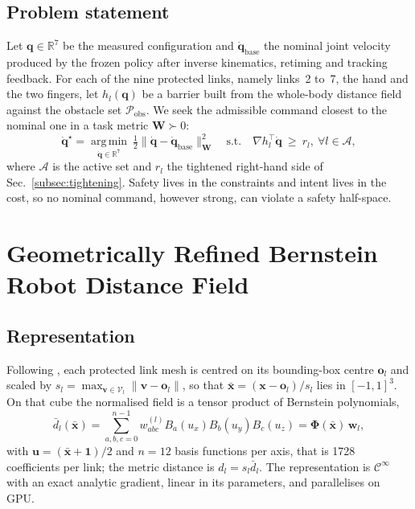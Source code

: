 \documentclass[journal]{IEEEtran}
\newcommand{\qdot}{\dot{\mathbf{q}}}
\begin{document}
\subsection{Problem statement}
Let $\mathbf{q}\in\mathbb{R}^7$ be the measured configuration and $\qdot_{\mathrm{base}}$ the nominal joint velocity produced by the frozen policy after inverse kinematics, retiming and tracking feedback. For each of the nine protected links, namely links~2 to~7, the hand and the two fingers, let $h_l(\mathbf{q})$ be a barrier built from the whole-body distance field against the obstacle set $\mathcal{P}_{\mathrm{obs}}$. We seek the admissible command closest to the nominal one in a task metric $\mathbf{W}\succ 0$:
\begin{equation}\label{eq:qp}
\qdot^{\star}=\operatorname*{arg\,min}_{\qdot\in\mathbb{R}^7}\ \tfrac12\|\qdot-\qdot_{\mathrm{base}}\|_{\mathbf{W}}^2
\quad\text{s.t.}\quad \nabla h_l^{\top}\qdot\ \ge\ r_l,\ \forall l\in\mathcal{A},
\end{equation}
where $\mathcal{A}$ is the active set and $r_l$ the tightened right-hand side of Sec.~\ref{subsec:tightening}. Safety lives in the constraints and intent lives in the cost, so no nominal command, however strong, can violate a safety half-space.

\section{Geometrically Refined Bernstein Robot Distance Field}\label{sec:rdf}

\subsection{Representation}
Following \cite{Li2024rdf}, each protected link mesh is centred on its bounding-box centre $\mathbf{o}_l$ and scaled by $s_l=\max_{\mathbf{v}\in\mathcal{V}_l}\|\mathbf{v}-\mathbf{o}_l\|$, so that $\bar{\mathbf{x}}=(\mathbf{x}-\mathbf{o}_l)/s_l$ lies in $[-1,1]^3$. On that cube the normalised field is a tensor product of Bernstein polynomials,
\begin{equation}\label{eq:bernstein}
\bar d_l(\bar{\mathbf{x}})=\!\!\sum_{a,b,c=0}^{n-1}\!\! w^{(l)}_{abc}B_a(u_x)B_b(u_y)B_c(u_z)=\boldsymbol{\Phi}(\bar{\mathbf{x}})\,\mathbf{w}_l,
\end{equation}
with $\mathbf{u}=(\bar{\mathbf{x}}+\mathbf{1})/2$ and $n=12$ basis functions per axis, that is 1728 coefficients per link; the metric distance is $d_l=s_l\bar d_l$. The representation is $\mathcal{C}^\infty$ with an exact analytic gradient, linear in its parameters, and parallelises on GPU.
\end{document}
